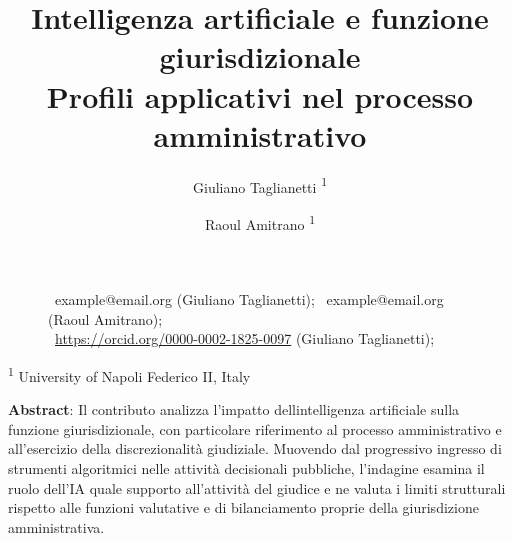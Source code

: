 \documentclass[american,a4paper,]{article}
\title{Intelligenza artificiale e funzione giurisdizionale\\ \large Profili applicativi nel processo amministrativo}
\author{
{\small Giuliano Taglianetti}
{\small\textsuperscript{1}}
 \and {\small Raoul Amitrano}
{\small\textsuperscript{1}}
}
\date{}
\begin{document}
\maketitle
{}

\begin{figure}[!b]
\begin{minipage}{0.9\textwidth}
\scriptsize\sffamily
\faEnvelope
~example@email.org (Giuliano Taglianetti);
~example@email.org (Raoul Amitrano);
\\
\aiOrcid~\url{https://orcid.org/0000-0002-1825-0097} (Giuliano Taglianetti);
\end{minipage}
\end{figure}

\newenvironment*{institute}{}{}
\begin{institute}
\footnotesize
\textsuperscript{1} University of Napoli Federico II, Italy\\
\end{institute}



\vspace{1cm}
\textbf{Abstract}: Il contributo analizza l'impatto dell\textquotesingle intelligenza artificiale sulla funzione giurisdizionale, con particolare riferimento al processo amministrativo e all'esercizio della discrezionalità giudiziale. Muovendo dal progressivo ingresso di strumenti algoritmici nelle attività decisionali pubbliche, l'indagine esamina il ruolo dell'IA quale supporto all'attività del giudice e ne valuta i limiti strutturali rispetto alle funzioni valutative e di bilanciamento proprie della giurisdizione amministrativa.
\end{document}
